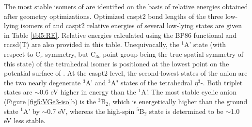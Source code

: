 \begin{refsection}
The most stable isomers of  are identified on the basis of relative energies obtained after geometry optimizations. Optimized \acrshort{caspt2} bond lengths of the three low-lying isomers of  and \acrshort{caspt2} relative energies of several low-lying states are given in Table \ref{tbl5:RE}. Relative energies calculated using the BP86 functional and \acrshort{rccsd}(T) are also provided in this table. Unequivocally, the $^1$A' state (with respect to C$_s$ symmetry, but C$_{3v}$ point group being the true spatial symmetry of this state) of the tetrahedral isomer is positioned at the lowest point on the potential surface of . At the \acrshort{caspt2} level, the second-lowest states of the anion are the two nearly degenerate $^3$A' and $^3$A" states of the tetrahedral $\eta^{3}$-. Both triplet states are $\sim$0.6 eV higher in energy than the $^1$A'. The most stable cyclic anion (Figure \ref{fig5:VGe3-iso}b) is the $^3$B$_2$, which is energetically higher than the ground state $^1$A' by $\sim$0.7 eV, whereas the high-spin $^5$B$_2$ state is determined to be $\sim$1.0 eV less stable.





\end{refsection}
